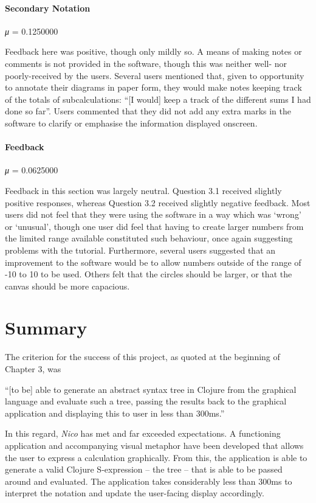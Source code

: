 \documentclass[12pt,twoside,notitlepage,xetex]{report}
\begin{document}
{\paragraph{Secondary Notation}\hfill

\emph{μ} = 0.1250000

Feedback here was positive, though only mildly so.  A means of making notes or comments is not provided in the software, though this was neither well- nor poorly-received by the users.  Several users mentioned that, given to opportunity to annotate their diagrams in paper form, they would make notes keeping track of the totals of subcalculations: ``[I would] keep a track of the different sums I had done so far''.  Users commented that they did not add any extra marks in the software to clarify or emphasise the information displayed onscreen.

\paragraph{Feedback}\hfill

\emph{μ} = 0.0625000

Feedback in this section was largely neutral.  Question 3.1 received slightly positive responses, whereas Question 3.2 received slightly negative feedback.  Most users did not feel that they were using the software in a way which was `wrong' or `unusual', though one user did feel that having to create larger numbers from the limited range available constituted such behaviour, once again suggesting problems with the tutorial.  Furthermore, several users suggested that an improvement to the software would be to allow numbers outside of the range of -10 to 10 to be used.  Others felt that the circles should be larger, or that the canvas should be more capacious.

\section{Summary}
The criterion for the success of this project, as quoted at the beginning of Chapter 3, was
\begin{center}
\parbox[c]{\textwidth-2cm}{
\small
``[to be] able to generate an abstract syntax tree in Clojure from the graphical language and evaluate such a tree, passing the results back to the graphical application and displaying this to user in less than 300ms.''
}
\end{center}
In this regard, \emph{Nico} has met and far exceeded expectations.  A functioning application and accompanying visual metaphor have been developed that allows the user to express a calculation graphically.  From this, the application is able to generate a valid Clojure S-expression -- the tree -- that is able to be passed around and evaluated.  The application takes considerably less than 300ms to interpret the notation and update the user-facing display accordingly.

}
\end{document}

